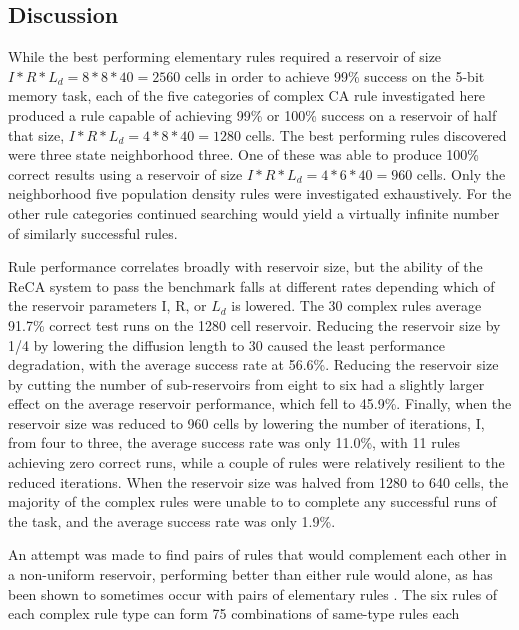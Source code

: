 \documentclass{article}
\begin{document}
\begin{multicols}{2}
\section{Discussion}\label{discussion}
While the best performing elementary rules required a reservoir of size $I * R 
* L_{d} = 8 * 8 * 40 = 2560$ cells in order to achieve 99\% success on the 
5-bit memory task, each of the five categories of complex CA rule investigated 
here produced a rule capable of achieving 99\% or 100\% success on a reservoir 
of half that size, $I * R * L_{d} = 4 * 8 * 40 = 1280$ cells. The best 
performing rules discovered were three state neighborhood three. One of these 
was able to produce 100\% correct results using a reservoir of size $I * R * 
L_{d} = 4 * 6 * 40 = 960$ cells. Only the neighborhood five population density 
rules were investigated exhaustively.  For the other rule categories continued 
searching would yield a virtually infinite number of similarly successful 
rules. \par Rule performance correlates broadly with reservoir size, but the 
ability of the ReCA system to  pass the benchmark falls at different rates 
depending which of the reservoir parameters I, R, or $L_{d}$ is lowered. The 30 
complex rules average 91.7\% correct test runs on the 1280 cell reservoir.  
Reducing the reservoir size by 1/4 by lowering the diffusion length to 30 
caused the least performance degradation, with the average success rate at 
56.6\%. Reducing the reservoir size by cutting the number of sub-reservoirs 
from eight to six had a slightly larger effect on the average reservoir 
performance, which fell to 45.9\%.  Finally, when the reservoir size was 
reduced to 960 cells by lowering the number of iterations, I, from four to 
three, the average success rate was only 11.0\%, with 11 rules achieving zero 
correct runs, while a  couple of rules were  relatively resilient to the 
reduced iterations. When the reservoir size was halved from 1280 to 640  cells, 
        the majority of the complex rules were unable to to complete any 
        successful runs of the task, and the average success rate was only 
        1.9\%. \par An attempt was made to find pairs of rules that would 
        complement each other in a non-uniform reservoir, performing better 
        than either rule would alone, as has been shown to sometimes occur with 
        pairs of elementary rules \cite{nichele2017reservoir}. The six rules of 
        each complex rule type can form 75 combinations of same-type rules each 

\end{multicols}
\end{document}
